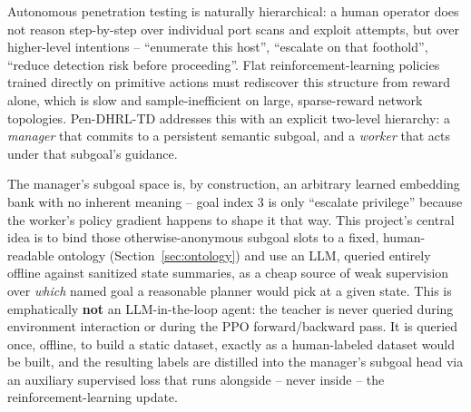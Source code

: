 \documentclass[11pt]{article}
\newcommand{\pendhrl}{Pen-DHRL-TD}
\begin{document}
Autonomous penetration testing is naturally hierarchical: a human operator does not
reason step-by-step over individual port scans and exploit attempts, but over
higher-level intentions -- ``enumerate this host'', ``escalate on that foothold'',
``reduce detection risk before proceeding''. Flat reinforcement-learning policies
trained directly on primitive actions must rediscover this structure from reward
alone, which is slow and sample-inefficient on large, sparse-reward network
topologies. \pendhrl{} addresses this with an explicit two-level hierarchy: a
\emph{manager} that commits to a persistent semantic subgoal, and a \emph{worker}
that acts under that subgoal's guidance.

The manager's subgoal space is, by construction, an arbitrary learned embedding bank
with no inherent meaning -- goal index 3 is only ``escalate privilege'' because the
worker's policy gradient happens to shape it that way. This project's central idea is
to bind those otherwise-anonymous subgoal slots to a fixed, human-readable ontology
(Section~\ref{sec:ontology}) and use an LLM, queried entirely offline against
sanitized state summaries, as a cheap source of weak supervision over \emph{which}
named goal a reasonable planner would pick at a given state. This is emphatically
\textbf{not} an LLM-in-the-loop agent: the teacher is never queried during environment
interaction or during the PPO forward/backward pass. It is queried once, offline, to
build a static dataset, exactly as a human-labeled dataset would be built, and the
resulting labels are distilled into the manager's subgoal head via an auxiliary
supervised loss that runs alongside -- never inside -- the reinforcement-learning
update.
\end{document}
